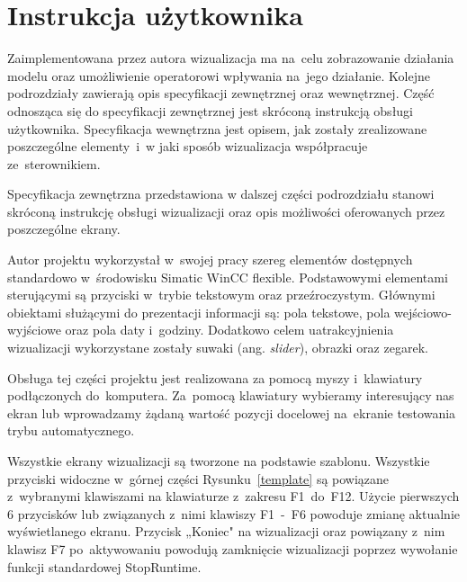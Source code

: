 \section{Instrukcja użytkownika}
Zaimplementowana przez autora wizualizacja ma na~celu zobrazowanie działania modelu oraz umożliwienie operatorowi wpływania na~jego działanie. Kolejne podrozdziały zawierają opis specyfikacji zewnętrznej oraz wewnętrznej. Część odnosząca się do specyfikacji zewnętrznej jest skróconą instrukcją obsługi użytkownika. Specyfikacja wewnętrzna jest opisem, jak zostały zrealizowane poszczególne elementy~i~w jaki sposób wizualizacja współpracuje ze~sterownikiem.


Specyfikacja zewnętrzna przedstawiona w dalszej części podrozdziału stanowi skróconą instrukcję obsługi wizualizacji oraz opis możliwości oferowanych przez poszczególne ekrany.

Autor projektu wykorzystał w~swojej pracy szereg elementów dostępnych standardowo w~środowisku Simatic WinCC flexible. Podstawowymi elementami sterującymi są przyciski w~trybie tekstowym oraz przeźroczystym. Głównymi obiektami służącymi do prezentacji informacji są: pola tekstowe, pola wejściowo-wyjściowe oraz pola daty i~godziny. Dodatkowo celem uatrakcyjnienia wizualizacji wykorzystane zostały suwaki (ang. \emph{slider}), obrazki oraz zegarek. 

Obsługa tej części projektu jest realizowana za pomocą myszy i~klawiatury podłączonych do~komputera. Za~pomocą klawiatury wybieramy interesujący nas ekran lub wprowadzamy żądaną wartość pozycji docelowej na~ekranie testowania trybu automatycznego.

Wszystkie ekrany wizualizacji są tworzone na podstawie szablonu. Wszystkie przyciski widoczne w~górnej części Rysunku~\ref{template} są powiązane z~wybranymi klawiszami na klawiaturze z~zakresu F1~do~F12. 
Użycie pierwszych 6 przycisków lub związanych z~nimi klawiszy F1~-~F6 powoduje zmianę aktualnie wyświetlanego ekranu.
Przycisk „Koniec" \space na wizualizacji oraz powiązany z~nim klawisz F7 po~aktywowaniu powodują zamknięcie wizualizacji poprzez wywołanie funkcji standardowej StopRuntime.

